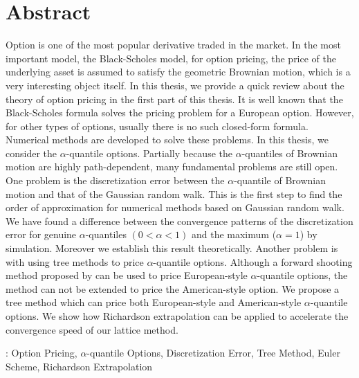 \chapter{Abstract}
Option is one of the most popular derivative traded in the market. 
In the most important model, the Black-Scholes model, for option pricing, the price of the underlying asset is assumed to satisfy the geometric Brownian motion, which is a very interesting object itself. In this thesis, we provide a quick review about the theory of option pricing in the first part of this thesis. It is well known that the Black-Scholes formula solves the pricing problem for a European option. However, for other types of options, usually there is no such closed-form formula. Numerical methods are developed to solve these problems. In this thesis, we consider the $\alpha$-quantile options. Partially because the $\alpha$-quantiles of Brownian motion are highly path-dependent, many fundamental problems are still open. One problem is the discretization error between the $\alpha$-quantile of Brownian motion and that of the Gaussian random walk. This is the first step to find the order of approximation for numerical 
methods based on Gaussian random walk. We have found a difference between the convergence patterns of the discretization error for genuine $\alpha$-quantiles $(0< \alpha < 1)$ and the maximum ($\alpha=1$) by simulation. Moreover we establish this result theoretically. Another problem is with using tree methods to price $\alpha$-quantile options. Although a forward shooting method proposed by \cite{Kwok2001} can be used to price European-style $\alpha$-quantile options, the method can not be extended to price the American-style option.  We propose a tree method which can price both European-style and American-style $\alpha$-quantile options. We show how Richardson extrapolation can be applied to accelerate the convergence speed of our lattice method. 
\vspace{1cm}

: Option Pricing, $\alpha$-quantile Options, Discretization Error, Tree Method, Euler Scheme, Richardson Extrapolation
